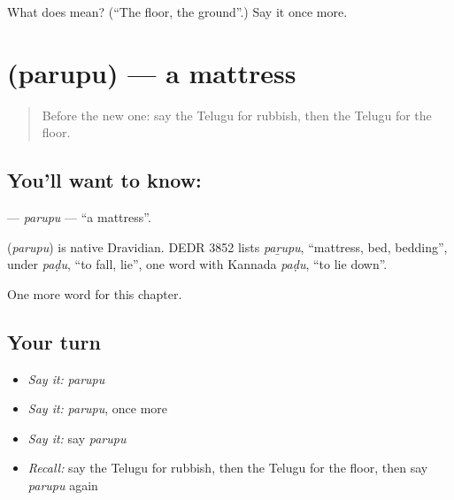 \begin{tcolorbox}[breakable,colback=teal!4,colframe=teal!35!black,title={Before you move on}]
What does  mean? (\textquotedblleft{}The floor, the ground\textquotedblright{}.) Say it once more.
\end{tcolorbox}
\section[\texorpdfstring{\te{పరుపు} (parupu)}{పరుపు (parupu)}]{ (parupu) — a mattress}

\label{lesson:TE-C224-parupu}



\begin{quote}
Before the new one: say the Telugu for rubbish, then the Telugu for the floor.
\end{quote}

\subsection*{You'll want to know: }
\textbf{} — \emph{parupu} — \textquotedblleft{}a mattress\textquotedblright{}.

\begin{cousinweb}
\textbf{} (\emph{parupu}) is native Dravidian. DEDR 3852 lists \emph{paṟupu}, \textquotedblleft{}mattress, bed, bedding\textquotedblright{}, under \emph{paḍu}, \textquotedblleft{}to fall, lie\textquotedblright{}, one word with Kannada \emph{paḍu}, \textquotedblleft{}to lie down\textquotedblright{}.
\end{cousinweb}

\begin{grammarlens}[title={What you've built}]
One more word for this chapter.
\end{grammarlens}

\subsection*{Your turn}
\begin{itemize}
\raggedright
  \item \emph{Say it:} \emph{parupu}
  \item \emph{Say it:} \emph{parupu}, once more
  \item \emph{Say it:} say \emph{parupu}
  \item \emph{Recall:} say the Telugu for rubbish, then the Telugu for the floor, then say \emph{parupu} again
\end{itemize}

